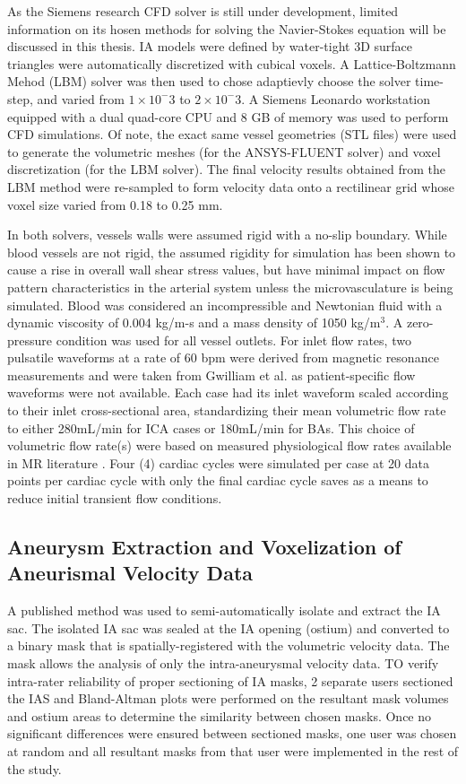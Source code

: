 As the Siemens research CFD solver is still under development, limited information on its hosen methods for solving the Navier-Stokes equation will be discussed in this thesis. IA models were defined by water-tight 3D surface triangles were automatically discretized with cubical voxels. A Lattice-Boltzmann Mehod (LBM) solver was then used to chose adaptievly choose the solver time-step, and varied from $1\times 10^-3$ to $2\times 10^-3$. A Siemens Leonardo workstation equipped with a dual quad-core CPU and 8 GB of memory was used to perform CFD simulations. Of note, the exact same vessel geometries (STL files) were used to generate the volumetric meshes (for the ANSYS-FLUENT solver) and voxel discretization (for the LBM solver). The final velocity results obtained from the LBM method were re-sampled to form velocity data onto a rectilinear grid whose voxel size varied from 0.18 to 0.25 mm.

In both solvers, vessels walls were assumed rigid with a no-slip boundary. While blood vessels are not rigid, the assumed rigidity for simulation has been shown to cause a rise in overall wall shear stress values, but have minimal impact on flow pattern characteristics in the arterial system unless the microvasculature is being simulated.  Blood was considered an incompressible and Newtonian fluid with a dynamic viscosity of 0.004 kg/m-s and a mass density of 1050 kg/m$^3$. A zero-pressure condition was used for all vessel outlets. For inlet flow rates, two pulsatile waveforms at a rate of 60 bpm were derived from magnetic resonance measurements and were taken from Gwilliam et al. \cite{gwilliam2009mr} as patient-specific flow waveforms were not available. Each case had its inlet waveform scaled according to their inlet cross-sectional area, standardizing their mean volumetric flow rate to either 280mL/min for ICA cases or 180mL/min for BAs. This choice of volumetric flow rate(s) were based on measured physiological flow rates available in MR literature \cite{enzmann1994blood,zhao2007regional}. Four (4) cardiac cycles were simulated per case at 20 data points per cardiac cycle with only the final cardiac cycle saves as a means to reduce initial transient flow conditions.  

\subsection{Aneurysm Extraction and Voxelization of Aneurismal Velocity Data}
A published method \cite{jiang2013interactive} was used to semi-automatically isolate and extract the IA sac. The isolated IA sac was sealed at the IA opening (ostium) and converted to a binary mask that is spatially-registered with the volumetric velocity data. The mask allows the analysis of only the intra-aneurysmal velocity data. TO verify intra-rater reliability of proper sectioning of IA masks, 2 separate users sectioned the IAS and Bland-Altman plots were performed on the resultant mask volumes and ostium areas to determine the similarity between chosen masks. Once no significant differences were ensured between sectioned masks, one user was chosen at random and all resultant masks from that user were implemented in the rest of the study. 

